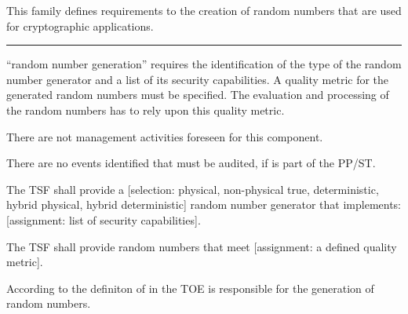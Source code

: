 


This family defines requirements to the creation of random numbers that are used
for cryptographic applications.


\vspace{2ex}
%
\rule[.5ex]{2cm}{0.1pt}%
\par
\vspace{2ex}

 ``random number generation'' requires the identification of
the type of the random number generator and a list of its security capabilities. A
quality metric for the generated random numbers must be specified. The
evaluation and processing of the random numbers has to rely upon this quality
metric.



There are not management activities foreseen for this component.


There are no events identified that must be audited, if  is part of the PP/ST.

\vspace{1ex}


\begin{sfrdefinitionlist}
\item[{\normalfont{\small\secitem{FCS_RNG.1.1}}}] The TSF shall provide a {[}selection:
  physical, non-physical true, deterministic, hybrid physical, hybrid
  deterministic] random number generator that implements:
  {[}assignment: list of security capabilities{]}.
\end{sfrdefinitionlist}

\begin{sfrdefinitionlist}
\item[{\normalfont{\small\secitem{FCS_RNG.1.2}}}] The TSF shall provide random numbers that
  meet {[}assignment: a defined quality metric{]}.
\end{sfrdefinitionlist}


According to the definiton of  in \citepp{} the TOE is
responsible for the generation of random numbers.

